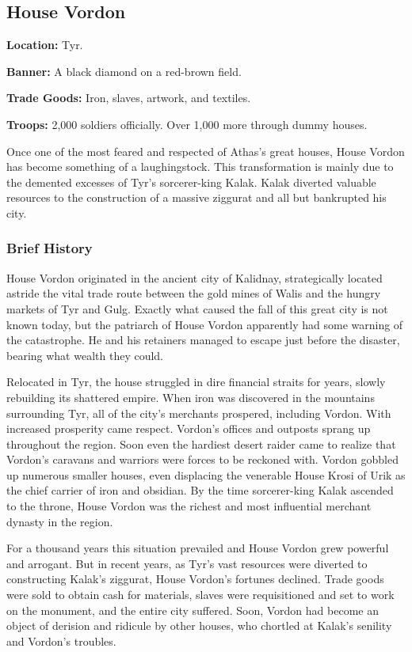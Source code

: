 \subsection{House Vordon}
\textbf{Location:} Tyr.

\textbf{Banner:} A black diamond on a red-brown field.

\textbf{Trade Goods:} Iron, slaves, artwork, and textiles.

\textbf{Troops:} 2,000 soldiers officially. Over 1,000 more through dummy houses.

Once one of the most feared and respected of Athas's great houses, House Vordon has become something of a laughingstock. This transformation is mainly due to the demented excesses of Tyr's sorcerer-king Kalak. Kalak diverted valuable resources to the construction of a massive ziggurat and all but bankrupted his city.

\subsubsection{Brief History}
House Vordon originated in the ancient city of Kalidnay, strategically located astride the vital trade route between the gold mines of Walis and the hungry markets of Tyr and Gulg. Exactly what caused the fall of this great city is not known today, but the patriarch of House Vordon apparently had some warning of the catastrophe. He and his retainers managed to escape just before the disaster, bearing what wealth they could.

Relocated in Tyr, the house struggled in dire financial straits for years, slowly rebuilding its shattered empire. When iron was discovered in the mountains surrounding Tyr, all of the city's merchants prospered, including Vordon. With increased prosperity came respect. Vordon's offices and outposts sprang up throughout the region. Soon even the hardiest desert raider came to realize that Vordon's caravans and warriors were forces to be reckoned with. Vordon gobbled up numerous smaller houses, even displacing the venerable House Krosi of Urik as the chief carrier of iron and obsidian. By the time sorcerer-king Kalak ascended to the throne, House Vordon was the richest and most influential merchant dynasty in the region.

For a thousand years this situation prevailed and House Vordon grew powerful and arrogant. But in recent years, as Tyr's vast resources were diverted to constructing Kalak's ziggurat, House Vordon's fortunes declined. Trade goods were sold to obtain cash for materials, slaves were requisitioned and set to work on the monument, and the entire city suffered. Soon, Vordon had become an object of derision and ridicule by other houses, who chortled at Kalak's senility and Vordon's troubles.

